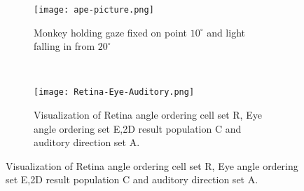 \documentclass[main]{subfiles}
\begin{document}
\begin{figure}[H]
	\centering
	\begin{subfigure}[b]{0.5\textwidth}
		\centering
		\texttt{[image: ape-picture.png]}
		\caption{Monkey holding gaze fixed on point $10^\circ$ and light falling in from $20^\circ$}
		\label{fig:APE}
	\end{subfigure}%
	~
	\begin{subfigure}[b]{0.5\textwidth}
		\centering
		\texttt{[image: Retina-Eye-Auditory.png]}
		\caption{Visualization of Retina angle ordering cell set R, Eye angle ordering set E,2D result population C and auditory direction set A.}
		\label{fig:REA}
	\end{subfigure}
\end{figure}

%
\end{document}
